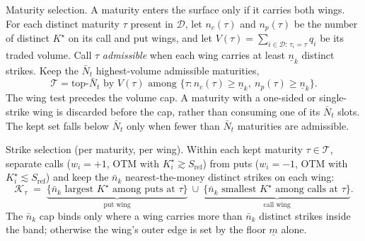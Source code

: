 \documentclass[a4paper, 11pt, reqno]{amsart}
\makeatletter
\def\paragraph{\@startsection{paragraph}{4}%
	\z@\z@{-\fontdimen2\font}%
	{\normalfont\bfseries}}
\newcommand{\ConstOtmFloorSym}{\underline{m}}            \newcommand{\ConstOtmFloorVal}{0.6}
\newcommand{\ConstMaxMaturitiesSym}{\bar N_t}            \newcommand{\ConstMaxMaturitiesVal}{20}
\newcommand{\ConstMinWingStrikesSym}{\underline{n}_{k}}  \newcommand{\ConstMinWingStrikesVal}{2}
\newcommand{\ConstMaxWingStrikesSym}{\bar{n}_{k}}        \newcommand{\ConstMaxWingStrikesVal}{40}
\makeatother
\begin{document}
		\paragraph{Maturity selection.} A maturity enters the surface only if it carries both wings.
		For each distinct maturity $\tau$ present in $\mathcal{D}$, let $n_c(\tau)$ and $n_p(\tau)$ be
		the number of distinct $K^\star$ on its call and put wings, and let
		$V(\tau)=\sum_{i\in\mathcal{D}:\,\tau_i=\tau} q_i$ be its traded volume. Call $\tau$
		\emph{admissible} when each wing carries at least $\ConstMinWingStrikesSym$ distinct strikes. Keep the $\ConstMaxMaturitiesSym$
		highest-volume admissible maturities,
		\begin{equation}
			\mathcal{T} = \text{top-}\ConstMaxMaturitiesSym \text{ by } V(\tau)
			\text{ among } \bigl\{\tau : n_c(\tau)\ge \ConstMinWingStrikesSym,\ n_p(\tau)\ge \ConstMinWingStrikesSym\bigr\}.
		\end{equation}
		The wing test precedes the volume cap. A maturity with a one-sided or single-strike wing is
		discarded before the cap, rather than consuming one of its $\ConstMaxMaturitiesSym$ slots. The kept set falls
		below $\ConstMaxMaturitiesSym$ only when fewer than $\ConstMaxMaturitiesSym$ maturities are admissible.
		
		\paragraph{Strike selection (per maturity, per wing).} Within each kept maturity
		$\tau\in\mathcal{T}$, separate calls ($w_i=+1$, OTM with $K^\star_i \gtrsim S_{\mathrm{ref}}$)
		from puts ($w_i=-1$, OTM with $K^\star_i \lesssim S_{\mathrm{ref}}$) and keep the $\ConstMaxWingStrikesSym$
		nearest-the-money distinct strikes on each wing:
		\begin{equation}
			\mathcal{K}_\tau \;=\;
			\underbrace{\bigl\{\text{$\ConstMaxWingStrikesSym$ largest } K^\star \text{ among puts at } \tau\bigr\}}_{\text{put wing}}
			\ \cup\
			\underbrace{\bigl\{\text{$\ConstMaxWingStrikesSym$ smallest } K^\star \text{ among calls at } \tau\bigr\}}_{\text{call wing}} .
		\end{equation}
		The $\ConstMaxWingStrikesSym$ cap binds only where a wing carries more than $\ConstMaxWingStrikesSym$ distinct strikes inside the band;
		otherwise the wing's outer edge is set by the floor $\ConstOtmFloorSym$ alone.
		
\end{document}
